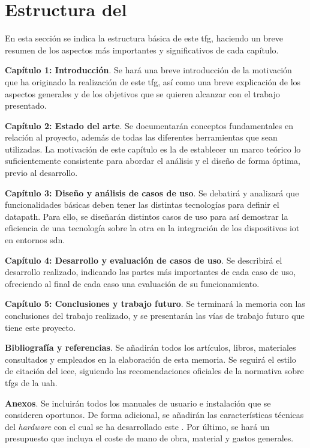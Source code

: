 \section{Estructura del }

En esta sección se indica la estructura básica de este \gls{tfg}, haciendo un breve resumen de los aspectos más importantes y significativos de cada capítulo. 


\begin{description}
\item\textbf{Capítulo 1: Introducción}. Se hará una breve introducción de la motivación que ha originado la realización de este \gls{tfg}, así como una breve explicación de los aspectos generales y de los objetivos que se quieren alcanzar con el trabajo presentado. 

\item\textbf{Capítulo 2: Estado del arte}. Se documentarán conceptos fundamentales en relación al proyecto, además de todas las diferentes herramientas que sean utilizadas. La motivación de este capítulo es la de establecer un marco teórico lo suficientemente consistente para abordar el análisis y el diseño de forma óptima, previo al desarrollo.

\item\textbf{Capítulo 3: Diseño y análisis de casos de uso}. Se debatirá y analizará que funcionalidades básicas deben tener las distintas tecnologías para definir el datapath. Para ello, se diseñarán distintos casos de uso para así demostrar la eficiencia de una tecnología sobre la otra en la integración de los dispositivos \gls{iot} en entornos \gls{sdn}.

\item\textbf{Capítulo 4: Desarrollo y evaluación de casos de uso}. Se describirá el desarrollo realizado, indicando las partes más importantes de cada caso de uso, ofreciendo al final de cada caso una evaluación de su funcionamiento. 

\item\textbf{Capítulo 5: Conclusiones y trabajo futuro}. Se terminará la memoria con las conclusiones del trabajo realizado, y se presentarán las vías de trabajo futuro que tiene este proyecto.

\item[]\textbf{Bibliografía y referencias}. Se añadirán todos los artículos, libros, materiales consultados y empleados en la elaboración de esta memoria. Se seguirá el estilo de citación del \gls{ieee}, siguiendo las recomendaciones oficiales de la normativa sobre \gls{tfg}s de la \gls{uah}. 

\item[]\textbf{Anexos}. Se incluirán todos los manuales de usuario e instalación que se consideren oportunos. De forma adicional, se añadirán las características técnicas del \textit{hardware} con el cual se ha desarrollado este . Por último, se hará un presupuesto que incluya el coste de mano de obra, material y gastos generales.

\end{description}

